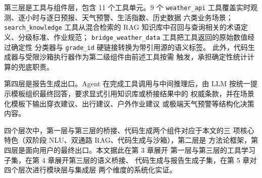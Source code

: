第三层是工具与组件层，包含 11 个工具单元。9 个 \texttt{weather\_\bk{}api}
工具覆盖实时观测、逐小时与逐日预报、天气预警、生活指数、历史数据
六类业务场景；\texttt{search\_\bk{}knowledge} 工具从混合检索的 RAG
知识库中召回与查询相关的术语定义、分级标准、作业规范；
\texttt{bridge\_\bk{}weather\_\bk{}data} 工具把工具返回的原始数值经过确定性
分类器与 \texttt{grade\_\bk{}id} 硬链接转换为带引用源的语义标签。
此外，代码生成器与受限沙箱执行器作为第二级组件由前述工具按需
触发，承担确定性统计计算的兜底职责。

第四层是报告生成出口。Agent 在完成工具调用与中间推理后，由 LLM
按统一提示模板组织最终回答，要求显式引用知识库或桥接结果中的
权威条款，并在场景化模板下输出穿衣建议、出行建议、户外作业建议
或极端天气预警等结构化决策内容。

四个层次中，第一层与第三层的桥接、代码生成两个组件对应于本文的三
项核心特色（双阶段 NLU、双通路 RAG、代码生成与沙箱），第二层是
方法论框架，第四层是面向用户的最终出口。本文据此在第 3 章展开
第一层与第三层的工具学习子集，在第 4 章展开第三层的语义桥接、
代码生成与报告生成子集，在第 5 章对四个层次进行模块层与集成层
两个维度的系统化实证。

